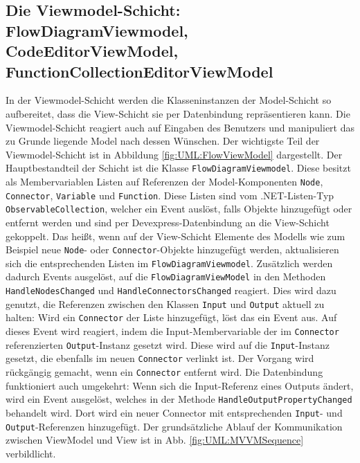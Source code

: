 \subsection[Die Viewmodel-Schicht]{Die Viewmodel-Schicht: FlowDiagramViewmodel, CodeEditorViewModel, FunctionCollectionEditorViewModel}
\label{subsec:Die Viewmodel-Schicht}
In der Viewmodel-Schicht werden die Klasseninstanzen der Model-Schicht so aufbereitet, dass die View-Schicht sie per Datenbindung repräsentieren kann. Die Viewmodel-Schicht reagiert auch auf Eingaben des Benutzers und manipuliert das zu Grunde liegende Model nach dessen Wünschen. Der wichtigste Teil der Viewmodel-Schicht ist in Abbildung \ref{fig:UML:FlowViewModel} dargestellt.  
\newline
Der Hauptbestandteil der Schicht ist die Klasse \texttt{FlowDiagramViewmodel}. Diese besitzt als Membervariablen Listen auf Referenzen der Model-Komponenten \texttt{Node}, \texttt{Connector}, \texttt{Variable} und \texttt{Function}. Diese Listen sind vom .NET-Listen-Typ \texttt{ObservableCollection}, welcher ein Event auslöst, falls Objekte hinzugefügt oder entfernt werden und sind per Devexpress-Datenbindung an die View-Schicht gekoppelt. Das heißt, wenn auf der View-Schicht Elemente des Modells wie zum Beispiel neue \texttt{Node}- oder \texttt{Connector}-Objekte hinzugefügt werden, aktualisieren sich die entsprechenden Listen im \texttt{FlowDiagramViewmodel}. Zusätzlich werden dadurch Events ausgelöst, auf die \texttt{FlowDiagramViewModel} in den Methoden \texttt{HandleNodesChanged} und \texttt{HandleConnectorsChanged} reagiert. Dies wird dazu genutzt, die Referenzen zwischen den Klassen \texttt{Input} und \texttt{Output} aktuell zu halten: Wird ein \texttt{Connector} der Liste hinzugefügt, löst das ein Event aus. Auf dieses Event wird reagiert, indem die Input-Membervariable der im \texttt{Connector} referenzierten \texttt{Output}-Instanz gesetzt wird. Diese wird auf die \texttt{Input}-Instanz gesetzt, die ebenfalls im neuen \texttt{Connector} verlinkt ist. Der Vorgang wird rückgängig gemacht, wenn ein \texttt{Connector} entfernt wird. Die Datenbindung funktioniert auch umgekehrt: Wenn sich die Input-Referenz eines Outputs ändert, wird ein Event ausgelöst, welches in der Methode \texttt{HandleOutputPropertyChanged} behandelt wird. Dort wird ein neuer Connector mit entsprechenden \texttt{Input}- und \texttt{Output}-Referenzen hinzugefügt. Der grundsätzliche Ablauf der Kommunikation zwischen ViewModel und View ist in Abb. \ref{fig:UML:MVVMSequence} verbildlicht.
\newline 
